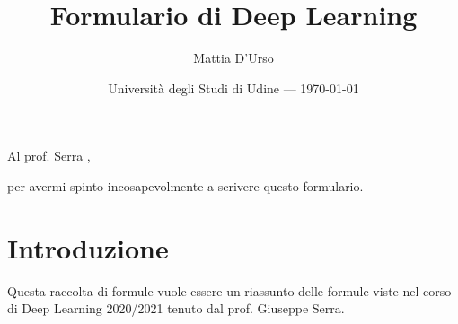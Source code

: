 \documentclass[]{article}
\title{Formulario di Deep Learning} %
\author{Mattia D'Urso} %
\date{Università degli Studi di Udine --- \today} %
\begin{document}



\begin{titlingpage}
\maketitle %
\end{titlingpage}



\addtocounter{page}{1}


\newenvironment{dedication}
  {%
   \thispagestyle{empty}%
   \vspace*{\stretch{1}}%
   \itshape             %
   \raggedleft          %
  }
  {\par %
   \vspace{\stretch{3}} %
   \clearpage           %
  }


  \begin{dedication}
Al prof. Serra ,\par per avermi spinto incosapevolmente a scrivere questo formulario.
  \end{dedication}


\renewcommand{\contentsname}{Indice dei contenuti}
\tableofcontents


\clearpage





\section{Introduzione}
Questa raccolta di formule vuole essere un riassunto delle formule viste nel corso di Deep Learning 2020/2021 tenuto dal prof. Giuseppe Serra.
\end{document}
